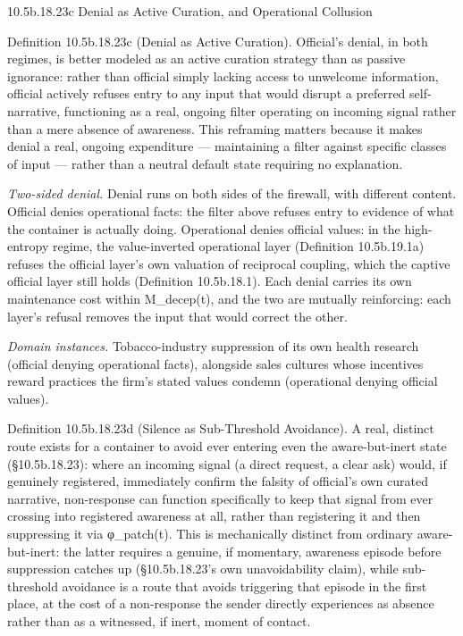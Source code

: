 \documentclass[
]{article}
\begin{document}
10.5b.18.23c Denial as Active Curation, and Operational Collusion

Definition 10.5b.18.23c (Denial as Active Curation). Official's denial,
in both regimes, is better modeled as an active curation strategy than
as passive ignorance: rather than official simply lacking access to
unwelcome information, official actively refuses entry to any input that
would disrupt a preferred self-narrative, functioning as a real, ongoing
filter operating on incoming signal rather than a mere absence of
awareness. This reframing matters because it makes denial a real,
ongoing expenditure --- maintaining a filter against specific classes of
input --- rather than a neutral default state requiring no explanation.

\emph{Two-sided denial.} Denial runs on both sides of the firewall, with
different content. Official denies operational facts: the filter above
refuses entry to evidence of what the container is actually doing.
Operational denies official values: in the high-entropy regime, the
value-inverted operational layer (Definition 10.5b.19.1a) refuses the
official layer's own valuation of reciprocal coupling, which the captive
official layer still holds (Definition 10.5b.18.1). Each denial carries
its own maintenance cost within M\_decep(t), and the two are mutually
reinforcing: each layer's refusal removes the input that would correct
the other.

\emph{Domain instances.} Tobacco-industry suppression of its own health
research (official denying operational facts), alongside sales cultures
whose incentives reward practices the firm's stated values condemn
(operational denying official values).

Definition 10.5b.18.23d (Silence as Sub-Threshold Avoidance). A real,
distinct route exists for a container to avoid ever entering even the
aware-but-inert state (§10.5b.18.23): where an incoming signal (a direct
request, a clear ask) would, if genuinely registered, immediately
confirm the falsity of official's own curated narrative, non-response
can function specifically to keep that signal from ever crossing into
registered awareness at all, rather than registering it and then
suppressing it via φ\_patch(t). This is mechanically distinct from
ordinary aware-but-inert: the latter requires a genuine, if momentary,
awareness episode before suppression catches up (§10.5b.18.23's own
unavoidability claim), while sub-threshold avoidance is a route that
avoids triggering that episode in the first place, at the cost of a
non-response the sender directly experiences as absence rather than as a
witnessed, if inert, moment of contact.
\end{document}
